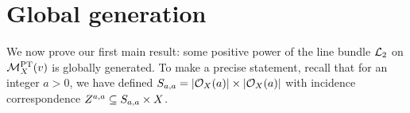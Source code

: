 \section{Global generation}

We now prove our first main result: some positive power of the line bundle $\mathcal{L}_2$ on $\mathcal{M}^{\text{PT}}_X(v)$ is globally generated. To make a precise statement, recall that for an integer $a > 0$, we have defined $S_{a,a} = |\mathcal{O}_X(a)| \times |\mathcal{O}_X(a)|$ with incidence correspondence $Z^{a,a} \subseteq S_{a,a} \times X$.

